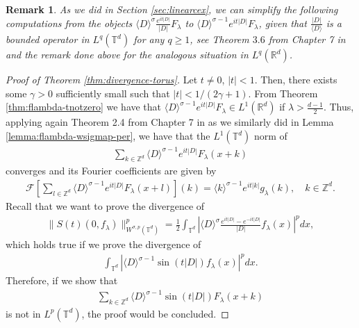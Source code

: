 \documentclass[a4paper, reqno, 11pt]{amsart}
\newtheorem{remark}[theorem]{Remark}
\theoremstyle{definition}
\begin{document}
\begin{remark}
As we did in Section \eqref{sec:linearcex}, we can simplify the following computations from the objects $\langle D \rangle^{\sigma} \frac{e^{it|D|}}{|D|} F_{\lambda}$ to  $\langle D \rangle^{\sigma-1} e^{it|D|} F_{\lambda}$, given that $\frac{|D|}{\langle D \rangle}$ is a bounded operator in $L^q(\mathbb{T}^d)$ for any $q \geq 1$, see Theorem $3.6$ from Chapter 7 in \cite{steinweiss} and the remark done above for the analogous situation in $L^q(\mathbb{R}^d)$.
\end{remark}

\begin{proof}[Proof of Theorem \ref{thm:divergence-torus}]
Let $t \neq 0$, $|t| < 1$. Then, there exists some $\gamma > 0$ sufficiently small such that $|t| < 1 / (2\gamma + 1)$. From Theorem \ref{thm:flambda-tnotzero} we have that $\langle D \rangle^{\sigma-1} e^{it|D|} F_{\lambda} \in L^1(\mathbb{R}^d)$ if $\lambda > \frac{d-1}{2}$. Thus, applying again Theorem 2.4 from Chapter 7 in \cite{steinweiss} as we similarly did in Lemma \ref{lemma:flambda-wsigmap-per}, we have that the $L^1(\mathbb{T}^d)$ norm of
\begin{align}\label{eq:flambdadef-t}
\sum_{k \in \mathbb{Z}^d} \langle D \rangle^{\sigma-1} e^{it|D|} F_{\lambda}(x+k)
\end{align}
converges and its Fourier coefficients are given by
\begin{align}\label{eq:periodization-obj2}
\mathcal{F}\left[ \sum_{l \in \mathbb{Z}^d} \langle D \rangle^{\sigma-1} e^{it|D|} F_{\lambda}(x+l) \right](k) = \langle k \rangle^{\sigma-1} e^{it|k|} g_{\lambda}(k), \quad k \in \mathbb{Z}^d.
\end{align} 
Recall that we want to prove the divergence of
\begin{align*}
\|S(t)(0,f_{\lambda})\|^p_{W^{\sigma,p}(\mathbb{T}^d)} = \frac{1}{2} \int_{\mathbb{T}^d} \left| \langle D \rangle^{\sigma} \frac{e^{it|D|} - e^{-it|D|}}{|D|} f_{\lambda}(x)\right|^p dx,
\end{align*}
which holds true if we prove the divergence of 
\begin{align}\label{eq:finaldiv-0}
\int_{\mathbb{T}^d} \left| \langle D \rangle^{\sigma-1} \sin(t|D|) f_{\lambda}(x)\right|^p dx.
\end{align}
Therefore, if we show that
\begin{align}\label{eq:finaldiv-2}
\sum_{k \in \mathbb{Z}^d} \langle D \rangle^{\sigma-1} \sin(t|D|) F_{\lambda}(x+k)
\end{align}
is not in $L^p(\mathbb{T}^d)$, the proof would be concluded. 


\end{proof}
\end{document}
